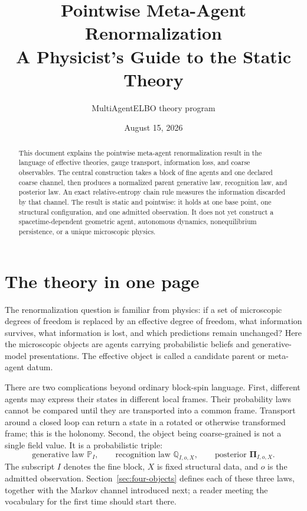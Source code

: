 \documentclass[11pt,letterpaper]{article}
\title{\textbf{Pointwise Meta-Agent Renormalization}\\[0.35em]
\Large A Physicist's Guide to the Static Theory}
\author{MultiAgentELBO theory program}
\date{August 15, 2026}
\newcommand{\Prob}{\mathbb P}
\newcommand{\Rec}{\mathbb Q}
\newcommand{\Post}{\boldsymbol\Pi}
\begin{document}
\maketitle

\begin{abstract}
This document explains the pointwise meta-agent renormalization result in the language of effective theories, gauge transport, information loss, and coarse observables. The central construction takes a block of fine agents and one declared coarse channel, then produces a normalized parent generative law, recognition law, and posterior law. An exact relative-entropy chain rule measures the information discarded by that channel. The result is static and pointwise: it holds at one base point, one structural configuration, and one admitted observation. It does not yet construct a spacetime-dependent geometric agent, autonomous dynamics, nonequilibrium persistence, or a unique microscopic physics.
\end{abstract}

\tableofcontents
\newpage

\section{The theory in one page}

The renormalization question is familiar from physics: if a set of microscopic degrees of freedom is replaced by an effective degree of freedom, what information survives, what information is lost, and which predictions remain unchanged? Here the microscopic objects are agents carrying probabilistic beliefs and generative-model presentations. The effective object is called a candidate parent or meta-agent datum.

There are two complications beyond ordinary block-spin language. First, different agents may express their states in different local frames. Their probability laws cannot be compared until they are transported into a common frame. Transport around a closed loop can return a state in a rotated or otherwise transformed frame; this is the holonomy. Second, the object being coarse-grained is not a single field value. It is a probabilistic triple:
\[
  \text{generative law } \Prob_I,
  \qquad
  \text{recognition law } \Rec_{I,o,X},
  \qquad
  \text{posterior } \Post_{I,o,X}.
\]
The subscript \(I\) denotes the fine block, \(X\) is fixed structural data, and \(o\) is the admitted observation. Section~\ref{sec:four-objects} defines each of these three laws, together with the Markov channel introduced next; a reader meeting the vocabulary for the first time should start there.
\end{document}
